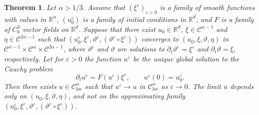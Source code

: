 \documentclass[11pt,a4paper]{article}
\newcommand{\tmop}[1]{\ensuremath{\operatorname{#1}}}
\newtheorem{theorem}{Theorem}[section]
\theoremstyle{remark}
\newcommand{\R}{\mathbb{R}}
\newcommand{\CC}{\ensuremath{\mathscr{C}}}
\begin{document}
\begin{theorem}\label{theorem:rde existence uniqueness}
  Let $\alpha >1/3$. Assume that $(\xi^{\varepsilon} )_{\varepsilon >0}$ is a family of smooth functions with
  values in $\mathbb{R}^{n}$, $(u^\varepsilon_0)$ is a family of initial conditions in $\R^d$, and $F$ is a family of $C^{3}_{b}$ vector
  fields on $\mathbb{R}^{d}$. Suppose that there exist $u_0 \in \R^d$, $\xi \in \CC^{\alpha -1}$ and $\eta \in \CC^{2 \alpha -1}$ such that $(u_0^\varepsilon, \xi^{\varepsilon} , \vartheta^\varepsilon, (\vartheta^{\varepsilon} \circ   \xi^{\varepsilon} ) )$ converges to $(u_0, \xi , \vartheta, \eta )$ in $\CC^{\alpha -1} \times \CC^\alpha \times \CC^{2 \alpha -1}$, where
  $\vartheta^{\varepsilon}$ and $\vartheta$ are solutions to $\partial_{t}  \vartheta^{\varepsilon} = \xi^{\varepsilon}$ and $\partial_t \vartheta = \xi$, respectively. Let for $\varepsilon >0$ the function $u^{\varepsilon}$ be the
  unique global solution to the Cauchy problem
  \[
     \partial_{t} u^{\varepsilon} =F ( u^{\varepsilon} ) \xi^{\varepsilon} , \hspace{2em} u^{\varepsilon} ( 0 ) =u^\varepsilon_{0} .
  \]
  Then there exists $u \in \CC^{\alpha}_\mathrm{loc}$ such that $u^{\varepsilon} \rightarrow u$ in $\CC^{\alpha}_{\tmop{loc}}$ as $\varepsilon \rightarrow 0$. The limit $u$ depends only on $( u_{0} , \xi , \vartheta , \eta )$, and not on the approximating family $(u_0^\varepsilon, \xi^{\varepsilon} , \vartheta^\varepsilon,  ( \vartheta^{\varepsilon} \circ   \xi^{\varepsilon} ) )$.
\end{theorem}
\end{document}
